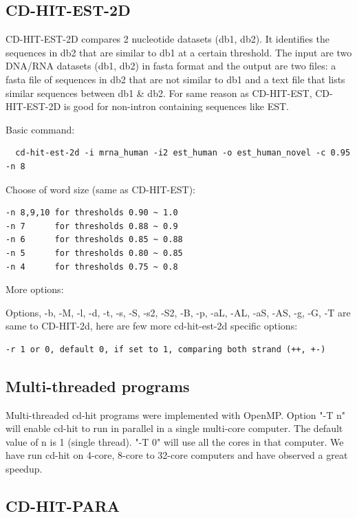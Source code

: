 \documentclass[12pt,a4paper]{article}
\begin{document}
\subsection{CD-HIT-EST-2D }

CD-HIT-EST-2D compares 2 nucleotide datasets (db1, db2). It identifies the
sequences in db2 that are similar to db1 at a certain threshold. The input are
two DNA/RNA datasets (db1, db2) in fasta format and the output are two files:
a fasta file of sequences in db2 that are not similar to db1 and a text file
that lists similar sequences between db1 \& db2.  
For same reason as CD-HIT-EST, CD-HIT-EST-2D is good for non-intron containing
sequences like EST.  

Basic command:

\begin{lstlisting}
  cd-hit-est-2d -i mrna_human -i2 est_human -o est_human_novel -c 0.95 -n 8  
\end{lstlisting}

Choose of word size (same as CD-HIT-EST):
\begin{lstlisting}
-n 8,9,10 for thresholds 0.90 ~ 1.0
-n 7      for thresholds 0.88 ~ 0.9
-n 6      for thresholds 0.85 ~ 0.88
-n 5      for thresholds 0.80 ~ 0.85
-n 4      for thresholds 0.75 ~ 0.8 
\end{lstlisting}

More options:

Options, -b, -M, -l, -d, -t, -s, -S, -s2, -S2, -B, -p, -aL, -AL, -aS, -AS, -g,
-G, -T are same to CD-HIT-2d, here are few more cd-hit-est-2d specific
options:
\begin{lstlisting}
-r 1 or 0, default 0, if set to 1, comparing both strand (++, +-)
\end{lstlisting}

\subsection{Multi-threaded programs }

Multi-threaded cd-hit programs were implemented with OpenMP. Option "-T
n" will enable cd-hit to run in parallel in a single multi-core computer.
The default value of n is 1 (single thread). "-T 0" will use all the
cores in that computer. We have run cd-hit on 4-core, 8-core to 32-core
computers and have observed a great speedup.

\subsection{CD-HIT-PARA }
\end{document}
